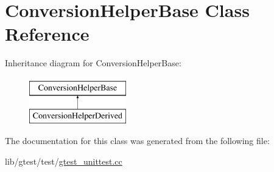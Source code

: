 \hypertarget{class_conversion_helper_base}{\section{Conversion\-Helper\-Base Class Reference}
\label{class_conversion_helper_base}
}
Inheritance diagram for Conversion\-Helper\-Base\-:\begin{figure}[H]
\begin{center}
\leavevmode
\includegraphics[height=2.000000cm]{class_conversion_helper_base}
\end{center}
\end{figure}


The documentation for this class was generated from the following file\-:\begin{DoxyCompactItemize}
\item 
lib/gtest/test/\hyperlink{gtest__unittest_8cc}{gtest\-\_\-unittest.\-cc}\end{DoxyCompactItemize}
